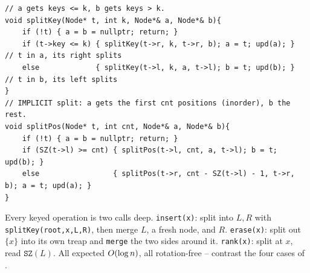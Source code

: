 \begin{lstlisting}[caption={Split by key (and its implicit by-position variant) -- cut a treap into two valid treaps}, label={lst:c06-split}]
// a gets keys <= k, b gets keys > k.
void splitKey(Node* t, int k, Node*& a, Node*& b){
    if (!t) { a = b = nullptr; return; }
    if (t->key <= k) { splitKey(t->r, k, t->r, b); a = t; upd(a); }  // t in a, its right splits
    else             { splitKey(t->l, k, a, t->l); b = t; upd(b); }  // t in b, its left splits
}
// IMPLICIT split: a gets the first cnt positions (inorder), b the rest.
void splitPos(Node* t, int cnt, Node*& a, Node*& b){
    if (!t) { a = b = nullptr; return; }
    if (SZ(t->l) >= cnt) { splitPos(t->l, cnt, a, t->l); b = t; upd(b); }
    else                 { splitPos(t->r, cnt - SZ(t->l) - 1, t->r, b); a = t; upd(a); }
}
\end{lstlisting}

\noindent Every keyed operation is two calls deep. \texttt{insert(x)}: split into $L,R$ with
\texttt{splitKey(root,x,L,R)}, then merge $L$, a fresh node, and $R$. \texttt{erase(x)}: split out
$\{x\}$ into its own treap and \texttt{merge} the two sides around it. \texttt{rank(x)}: split at $x$,
read $\texttt{SZ}(L)$. All expected $O(\log n)$, all rotation-free -- contrast the four cases of
.

